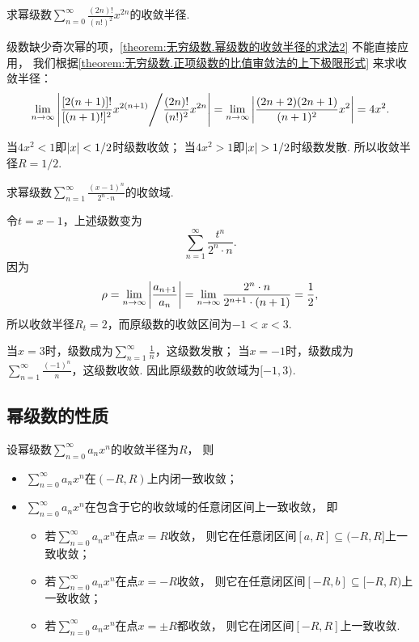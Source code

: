 \begin{example}
求幂级数\(\sum_{n=0}^\infty \frac{(2n)!}{(n!)^2} x^{2n}\)的收敛半径.
\begin{solution}
级数缺少奇次幂的项，\cref{theorem:无穷级数.幂级数的收敛半径的求法2} 不能直接应用，
我们根据\cref{theorem:无穷级数.正项级数的比值审敛法的上下极限形式} 来求收敛半径：
\[
	\lim_{n\to\infty} \abs{
		{\frac{[2(n+1)]!}{[(n+1)!]^2} x^{2(n+1)}}
		\Bigg/
		{\frac{(2n)!}{(n!)^2} x^{2n}}
	}
	= \lim_{n\to\infty} \abs{\frac{(2n+2)(2n+1)}{(n+1)^2} x^2}
	= 4 x^2.
\]

当\(4 x^2 < 1\)即\(\abs{x} < 1/2\)时级数收敛；
当\(4 x^2 > 1\)即\(\abs{x} > 1/2\)时级数发散.
所以收敛半径\(R = 1/2\).
\end{solution}
\end{example}

\begin{example}
求幂级数\(\sum_{n=1}^\infty \frac{(x-1)^n}{2^n \cdot n}\)的收敛域.
\begin{solution}
令\(t = x-1\)，上述级数变为\[
	\sum_{n=1}^\infty \frac{t^n}{2^n \cdot n}.
\]
因为\[
	\rho
	= \lim_{n\to\infty} \abs{\frac{a_{n+1}}{a_n}}
	= \lim_{n\to\infty} \frac{2^n \cdot n}{2^{n+1} \cdot (n+1)}
	= \frac{1}{2},
\]
所以收敛半径\(R_t = 2\)，而原级数的收敛区间为\(-1<x<3\).

当\(x=3\)时，级数成为\(\sum_{n=1}^\infty \frac{1}{n}\)，这级数发散；
当\(x=-1\)时，级数成为\(\sum_{n=1}^\infty \frac{(-1)^n}{n}\)，这级数收敛.
因此原级数的收敛域为\([-1,3)\).
\end{solution}
\end{example}

\subsection{幂级数的性质}
\begin{theorem}[阿贝尔第二定理]\label{theorem:无穷级数.阿贝尔定理2}
设幂级数\(\sum_{n=0}^\infty a_n x^n\)的收敛半径为\(R\)，
则\begin{itemize}
	\item \(\sum_{n=0}^\infty a_n x^n\)在\((-R,R)\)上内闭一致收敛；
	\item \(\sum_{n=0}^\infty a_n x^n\)在包含于它的收敛域的任意闭区间上一致收敛，
	即\begin{itemize}
		\item 若\(\sum_{n=0}^\infty a_n x^n\)在点\(x=R\)收敛，
		则它在任意闭区间\([a,R]\subseteq(-R,R]\)上一致收敛；
		\item 若\(\sum_{n=0}^\infty a_n x^n\)在点\(x=-R\)收敛，
		则它在任意闭区间\([-R,b]\subseteq[-R,R)\)上一致收敛；
		\item 若\(\sum_{n=0}^\infty a_n x^n\)在点\(x=\pm R\)都收敛，
		则它在闭区间\([-R,R]\)上一致收敛.
	\end{itemize}
\end{itemize}
\end{theorem}

